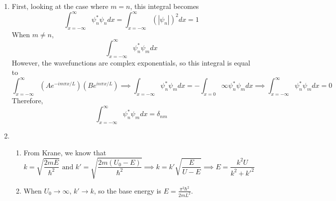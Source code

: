 \documentclass[fleqn]{article}[12pt]
\begin{document}
\begin{enumerate}
    \item First, looking at the case where $m=n$, this integral becomes
    \begin{equation*}
        \int_{x=-\infty}^{\infty} \psi_n^* \psi_n dx = \int_{x=-\infty}^{\infty} (|\psi_n|)^2 dx = 1
    \end{equation*}
    When $m\neq n$,
    \begin{equation*}
        \int_{x=-\infty}^{\infty} \psi_n^* \psi_m dx
    \end{equation*}
    However, the wavefunctions are complex exponentials, so this integral is equal to
    \begin{equation*}
        \int_{x=-\infty}^{\infty} (Ae^{-im \pi x/L})(Be^{in \pi x/L}) \implies \int_{x=-\infty} \psi_n^* \psi_m dx = -\int_{x=0}{\infty} \psi_n^* \psi_m dx \implies \int_{x=-\infty}^{\infty} \psi_n^* \psi_m dx = 0
    \end{equation*}
    Therefore,
    \begin{equation*}
        \int_{x=-\infty}^{\infty} \psi_n^* \psi_m dx = \delta_{nm}
    \end{equation*}

    \item \begin{enumerate}
        \item From Krane, we know that
        \begin{equation*}
            k = \sqrt{\frac{2mE}{\hbar^2}} \text{ and } k' = \sqrt{\frac{2m(U_0-E)}{\hbar^2}} \implies k =
            k'\sqrt{\frac{E}{U-E}} \implies E = \frac{k^2 U}{k^2 + k'^2}
        \end{equation*}

        \item When $U_0 \to \infty$, $k' \to k$, so the base energy is $E = \frac{\pi^2 \hbar^2}{2mL^2}$.

    \end{enumerate}


\end{enumerate}
\end{document}
